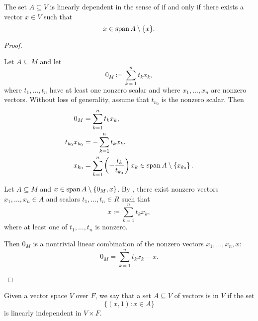 \begin{proposition}\label{thm:vector_space_linear_dependence}
  The set \( A \subseteq V \) is linearly dependent in the sense of  if and only if there exists a vector \( x \in V \) such that
  \begin{equation*}
    x \in \operatorname{span}{A} \setminus \{ x \}.
  \end{equation*}
\end{proposition}
\begin{proof}
  \begin{description}
    \Implies Let \( A \subseteq M \) and let
    \begin{equation*}
      0_M \coloneqq \sum_{k=1}^n t_k x_k,
    \end{equation*}
    where \( t_1, \ldots, t_n \) have at least one nonzero scalar and where \( x_1, \ldots, x_n \) are nonzero vectors. Without loss of generality, assume that \( t_{n_0} \) is the nonzero scalar. Then
    \begin{align*}
      0_M &= \sum_{k=1}^n t_k x_k, \\
      t_{k_0} x_{k_0} &= -\sum_{k=1}^n t_k x_k, \\
      x_{k_0} &= \sum_{k=1}^n \left(-\frac {t_k} {t_{k_0}} \right) x_k \in \operatorname{span}{A} \setminus \left\{ x_{k_0} \right\}.
    \end{align*}

    \ImpliedBy Let \( A \subseteq M \) and \( x \in \operatorname{span}{A} \setminus \{ 0_M, x \} \). By , there exist nonzero vectors \( x_1, \ldots, x_n \in A \) and scalars \( t_1, \ldots, t_n \in R \) such that
    \begin{equation*}
      x \coloneqq \sum_{k=1}^n t_k x_k,
    \end{equation*}
    where at least one of \( t_1, \ldots, t_n \) is nonzero.

    Then \( 0_M \) is a nontrivial linear combination of the nonzero vectors \( x_1, \ldots, x_n, x \):
    \begin{equation*}
      0_M = \sum_{k=1}^n t_k x_k - x.
    \end{equation*}
  \end{description}
\end{proof}

\begin{definition}\label{affine_independence}
  Given a vector space \( V \) over \( F \), we say that a set \( A \subseteq V \) of vectors is  in \( V \) if the set
  \begin{equation*}
    \{ (x, 1) \colon x \in A \}
  \end{equation*}
  is linearly independent in \( V \times F \).
\end{definition}

